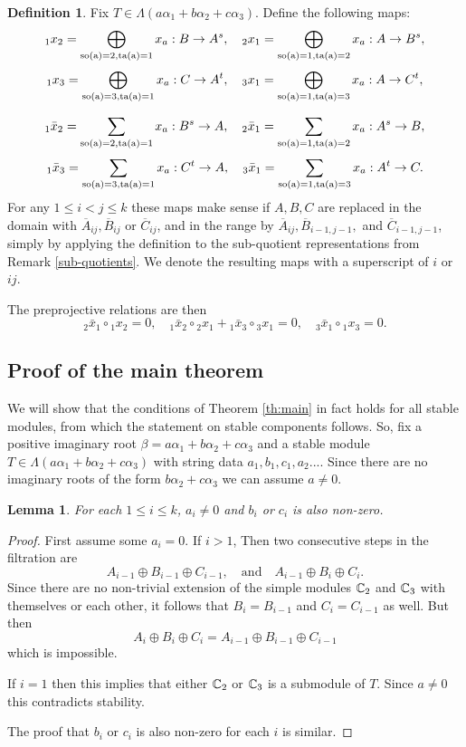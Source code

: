 \documentclass{amsart}
\numberwithin{equation}{section}
\numberwithin{figure}{section}
\numberwithin{table}{section}
\newtheorem{Lemma}[equation]{Lemma}
\theoremstyle{definition}
\newtheorem{Definition}[equation]{Definition}
\newcommand{\so}{\rm so}
\newcommand{\ta}{\rm ta}
\begin{document}
\begin{Definition}
Fix $T \in \Lambda(a\alpha_1+b\alpha_2+c\alpha_3)$. Define the following maps:
$${}_1x_2 = \bigoplus_{\so(a)=2, \ta(a)=1} x_a: B \rightarrow A^s, \quad  {}_2x_1= \bigoplus_{\so(a)=1, \ta(a)=2} x_a: A \rightarrow B^s, $$
$${}_1x_3 = \bigoplus_{\so(a)=3, \ta(a)=1} x_a: C \rightarrow A^t, \quad  {}_3x_1= \bigoplus_{\so(a)=1, \ta(a)=3} x_a: A \rightarrow C^t, $$

$${}_1\bar x_2 = \sum_{\so(a)=2, \ta(a)=1} x_a: B^s \rightarrow A, \quad  {}_2\bar x_1= \sum_{\so(a)=1, \ta(a)=2} x_a: A^s \rightarrow B, $$
$${}_1\bar x_3 = \sum_{\so(a)=3, \ta(a)=1} x_a: C^t \rightarrow A, \quad  {}_3\bar x_1= \sum_{\so(a)=1, \ta(a)=3} x_a: A^t \rightarrow C.$$
For any $1 \leq i<j \leq k$ these maps make sense if $A,B,C$ are replaced in the domain with $\overline A_{ij}, \overline B_{ij}$ or $\overline C_{ij}$, and in the range by $\overline A_{ij}, \overline B_{i-1,j-1},$ and $\overline C_{i-1,j-1}$, simply by applying the definition to the sub-quotient representations from Remark \ref{sub-quotients}. We denote the resulting maps with a superscript of $i$ or $ij$. 
\end{Definition}
The preprojective relations are then
$$
{}_ 2\bar x_1 \circ {}_1x_2=0, \quad {}_1 \bar x_2 \circ {}_2x_1+{}_1 \bar x_3 \circ {}_3x_1=0, \quad {}_3 \bar x_1 \circ {}_1x_3=0.
$$


\subsection{Proof of the main theorem}
We will show that the conditions of Theorem \ref{th:main} in fact holds for all stable modules, from which the statement on stable components follows. So, fix a positive imaginary root $\beta =a \alpha_1+b\alpha_2+c\alpha_3$ and  a stable module $T \in \Lambda(a \alpha_1+b\alpha_2+c\alpha_3)$ with string data $a_1,b_1,c_1,a_2...$. Since there are no imaginary roots of the form $b \alpha_2+c\alpha_3$ we can assume $a \neq 0$. 

\begin{Lemma} \label{lem:main0}
For each $1\leq i \leq k$, $a_i \neq 0$ and $b_i$ or $c_i$ is also non-zero. 
\end{Lemma}

\begin{proof}
First assume some $a_i=0$. If $i>1$, Then two consecutive steps in the filtration are
$$A_{i-1} \oplus B_{i-1} \oplus C_{i-1}, \quad \text{and} \quad A_{i-1} \oplus B_{i} \oplus C_{i}.$$
Since there are no non-trivial extension of the simple modules ${\Bbb C}_2$ and ${\Bbb C}_3$ with themselves or each other, it follows that $B_i=B_{i-1}$ and $C_i=C_{i-1}$ as well. But then $$A_i \oplus B_i \oplus C_i = A_{i-1} \oplus B_{i-1} \oplus C_{i-1}$$
which is impossible.

If $i=1$ then this implies that either ${\Bbb C}_2$ or ${\Bbb C}_3$ is a submodule of $T$. Since $a \neq 0$ this contradicts stability. 

The proof that $b_i$ or $c_i$ is also non-zero for each $i$ is similar. 
\end{proof}
\end{document}
